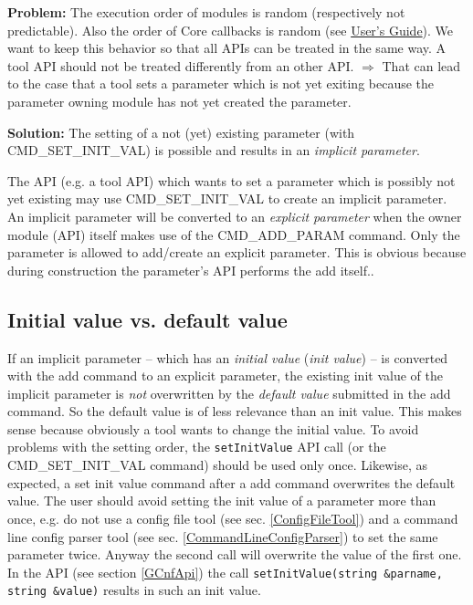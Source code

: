{\bf Problem:} The execution order of modules is random (respectively not predictable). Also the order of Core callbacks is random (see \hyperlink{GCUsersGuide}{\GreenControl User's Guide}). We want to keep this behavior so that all APIs can be treated
in the same way. A tool API should not be treated differently from an other API. $\Rightarrow$ That can lead to
the case that a tool sets a parameter which is not yet exiting because the parameter owning module has
not yet created the parameter.

{\bf Solution:} The setting of a not (yet) existing parameter (with CMD\_SET\_INIT\_VAL) is possible and results in an {\em implicit parameter}.

The API (e.g. a tool API) which wants to set a parameter which is possibly not yet existing may use
CMD\_SET\_INIT\_VAL to create an implicit parameter. An implicit parameter will be converted to an {\em
explicit parameter} when the owner module (API) itself makes use of the CMD\_ADD\_PARAM
command. Only the parameter is allowed to add/create an explicit parameter. This is obvious because during construction the parameter's API performs the add itself..

\subsection{Initial value vs. default value}
\label{ParamInitValue}
If an implicit parameter -- which has an {\em initial value} ({\em init value}) -- is converted with the add command to an explicit parameter, the existing init value of the implicit parameter is {\em not} overwritten by the {\em default value} submitted in the add
command. So the default value is of less relevance than an init value. This makes sense because
obviously a tool wants to change the initial value. To avoid problems with the setting order, the
\lstinline|setInitValue| API call (or the CMD\_SET\_INIT\_VAL command) should be used only once. Likewise, as expected, a set init value command after a add command overwrites the default value. The user should avoid setting the init value of a parameter more than once, e.g. do not use a config file tool (see sec. \ref{ConfigFileTool}) and a command line config parser tool (see sec. \ref{CommandLineConfigParser}) to set the same parameter twice. Anyway the second call will overwrite the value of the first one. In the \GreenConfig API (see section \ref{GCnfApi}) the call \lstinline|setInitValue(string &parname, string &value)| results in such an init value.

